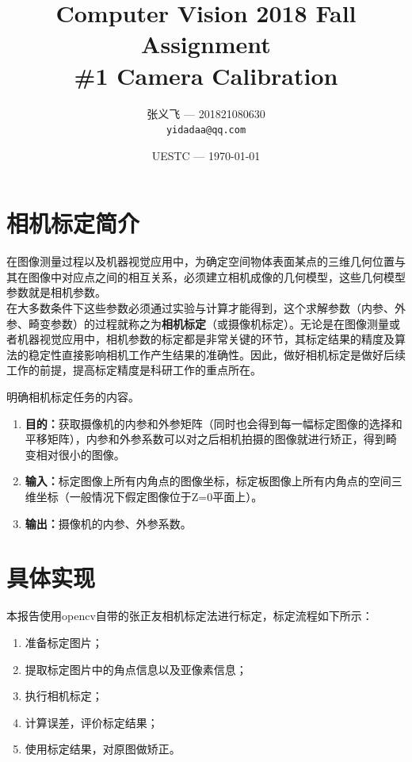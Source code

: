 \documentclass[]{article}
\title{Computer Vision 2018 Fall Assignment \\ \textbf{\#1 Camera Calibration}}
\author{张义飞 --- 201821080630\\ \texttt{yidadaa@qq.com}}
\date{\small{UESTC --- \today}}
\begin{document}
    \maketitle

    \section{相机标定简介}
    在图像测量过程以及机器视觉应用中，为确定空间物体表面某点的三维几何位置与其在图像中对应点之间的相互关系，必须建立相机成像的几何模型，这些几何模型参数就是相机参数。\\
    
    在大多数条件下这些参数必须通过实验与计算才能得到，这个求解参数（内参、外参、畸变参数）的过程就称之为\textbf{相机标定}（或摄像机标定）。无论是在图像测量或者机器视觉应用中，相机参数的标定都是非常关键的环节，其标定结果的精度及算法的稳定性直接影响相机工作产生结果的准确性。因此，做好相机标定是做好后续工作的前提，提高标定精度是科研工作的重点所在。\\
    
    \begin{question}
        明确相机标定任务的内容。
        \begin{enumerate}
            \item \textbf{目的：}获取摄像机的内参和外参矩阵（同时也会得到每一幅标定图像的选择和平移矩阵），内参和外参系数可以对之后相机拍摄的图像就进行矫正，得到畸变相对很小的图像。
            \item \textbf{输入：}标定图像上所有内角点的图像坐标，标定板图像上所有内角点的空间三维坐标（一般情况下假定图像位于Z=0平面上）。
            \item \textbf{输出：}摄像机的内参、外参系数。
        \end{enumerate}
    \end{question}

    \section{具体实现}
    本报告使用opencv自带的张正友相机标定法进行标定，标定流程如下所示：
    \begin{enumerate}
        \item 准备标定图片；
        \item 提取标定图片中的角点信息以及亚像素信息；
        \item 执行相机标定；
        \item 计算误差，评价标定结果；
        \item 使用标定结果，对原图做矫正。
    \end{enumerate}
\end{document}
